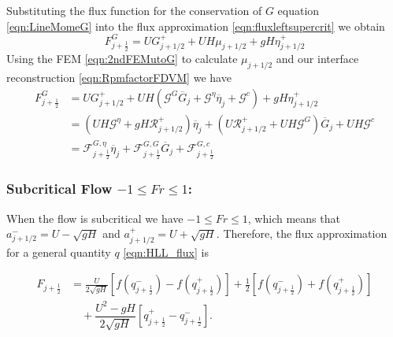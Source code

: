 Substituting the flux function for the conservation of $G$ equation \eqref{eqn:LineMomeG} into the flux approximation \eqref{eqn:fluxleftsupercrit} we obtain
\begin{equation*}
F^G_{j+\frac{1}{2}} =U G^+_{j+1/2} + U  H \mu_{j+1/2} + gH \eta^+_{j+1/2}
\end{equation*}
Using the FEM \eqref{eqn:2ndFEMutoG} to calculate $\mu_{j+1/2}$ and our interface reconstruction \eqref{eqn:RpmfactorFDVM} we have
\begin{align}
F^G_{j+\frac{1}{2}} &=  U G^+_{j+1/2} + UH \left(\mathcal{G}^G \overline{G}_{j} + \mathcal{G}^{\eta} \overline{\eta}_{j} + \mathcal{G}^c\right) + gH \eta^+_{j+1/2} \nonumber \\ &= \left(UH \mathcal{G}^{\eta} + gH \mathcal{R}^+_{j+1/2} \right)  \overline{\eta}_{j} + \left(U\mathcal{R}^+_{j+1/2}  +  UH \mathcal{G}^G \right) \overline{G}_{j} + UH\mathcal{G}^c \nonumber \\
&= \mathcal{F}^{G, \eta}_{j+\frac{1}{2}} \overline{\eta}_{j} + \mathcal{F}^{G, G}_{j+\frac{1}{2}} \overline{G}_{j} + \mathcal{F}^{G, c}_{j+\frac{1}{2}}
\label{eqn:FluxfactorsupercritGleft}
\end{align}


\subsubsection{Subcritical Flow $-1 \le Fr \le 1$:}
When the flow is subcritical we have $-1\le Fr \le 1$, which means that $a^-_{j+ 1/2} = U - \sqrt{g H}$ and $a^+_{j+ 1/2} =  U + \sqrt{g H}$. Therefore, the flux approximation for a general quantity $q$ \eqref{eqn:HLL_flux} is

\begin{align}
F_{j+\frac{1}{2}} &= \frac{U}{2 \sqrt{gH}} \left[f\left(q^-_{j+\frac{1}{2}}\right) - f\left(q^+_{j+\frac{1}{2}}\right) \right]  + \frac{1}{2}\left[f\left(q^-_{j+\frac{1}{2}}\right) + f\left(q^+_{j+\frac{1}{2}}\right)\right] \nonumber \\ & \quad  + \dfrac{U^2 - gH}{2\sqrt{g H}} \left [ q^+_{j+\frac{1}{2}} - q^-_{j+\frac{1}{2}} \right ].
\label{eqn:fluxsubcrit}
\end{align}


